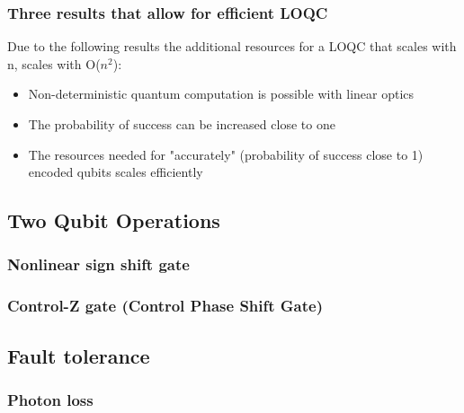 \subsubsection{Three results that allow for efficient LOQC}
Due to the following results the additional resources for a LOQC that scales with n, scales with O($n^2$):
\begin{itemize}
    \item Non-deterministic quantum computation is possible with linear optics
    \item The probability of success can be increased close to one
    \item The resources needed for "accurately" (probability of success close to 1) encoded qubits scales efficiently  
\end{itemize}


\subsection{Two Qubit Operations}
\subsubsection{Nonlinear sign shift gate}
\subsubsection{Control-Z gate (Control Phase Shift Gate)}


\subsection{Fault tolerance}
\subsubsection{Photon loss}